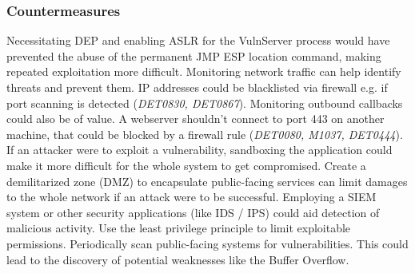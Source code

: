 \documentclass[../report.tex]{subfiles}
\begin{document}
\subsubsection{Countermeasures} \label{counta}
\begin{itemize}
Necessitating DEP and enabling ASLR for the VulnServer process would have prevented the abuse of the permanent JMP ESP location command, making repeated exploitation more difficult.
Monitoring network traffic can help identify threats and prevent them.
IP addresses could be blacklisted via firewall e.g. if port scanning is detected (\textit{DET0830, DET0867}).
Monitoring outbound callbacks could also be of value. A webserver shouldn't connect to port 443 on another machine, that could be blocked by a firewall rule  (\textit{DET0080, M1037, DET0444}).
If an attacker were to exploit a vulnerability, sandboxing the application could make it more difficult for the whole system to get compromised.
Create a demilitarized zone (DMZ) to encapsulate public-facing services can limit damages to the whole network if an attack were to be successful.
Employing a SIEM system or other security applications (like IDS / IPS) could aid detection of malicious activity.
Use the least privilege principle to limit exploitable permissions.
Periodically scan public-facing systems for vulnerabilities. This could lead to the discovery of potential weaknesses like the Buffer Overflow.
\end{itemize}
\end{document}
